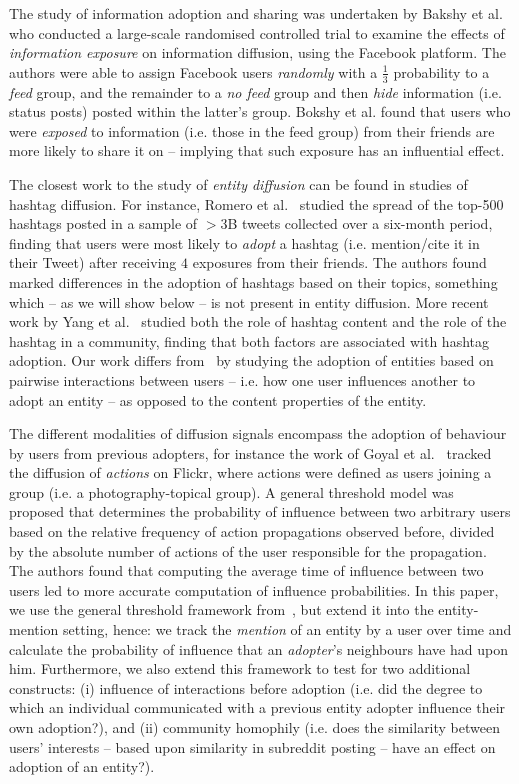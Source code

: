 \documentclass[acmsmall]{acmart}
\begin{document}
The study of information adoption and sharing was undertaken by Bakshy et al.~\cite{bakshy2012role} who conducted a large-scale randomised controlled trial to examine the effects of \emph{information exposure} on information diffusion, using the Facebook platform.
The authors were able to assign Facebook users \emph{randomly} with a $\frac{1}{3}$ probability to a \emph{feed} group, and the remainder to a \emph{no feed} group and then \emph{hide} information (i.e. status posts) posted within the latter's group.
Bokshy et al. found that users who were \emph{exposed} to information (i.e. those in the feed group) from their friends are more likely to share it on -- implying that such exposure has an influential effect.

The closest work to the study of \emph{entity diffusion} can be found in studies of hashtag diffusion.
For instance, Romero et al.~\cite{romero2011differences} studied the spread of the top-500 hashtags posted in a sample of $>3$B tweets collected over a six-month period, finding that users were most likely to \emph{adopt} a hashtag (i.e. mention/cite it in their Tweet) after receiving $4$ exposures from their friends.
The authors found marked differences in the adoption of hashtags based on their topics, something which -- as we will show below -- is not present in entity diffusion.
More recent work by Yang et al.~\cite{yang2012we} studied both the role of hashtag content and the role of the hashtag in a community, finding that both factors are associated with hashtag adoption.
Our work differs from~\cite{yang2012we} by studying the adoption of entities based on pairwise interactions between users -- i.e. how one user influences another to adopt an entity -- as opposed to the content properties of the entity.

The different modalities of diffusion signals encompass the adoption of behaviour by users from previous adopters, for instance the work of Goyal et al.~\cite{goyal2010learning} tracked the diffusion of \emph{actions} on Flickr, where actions were defined as users joining a group (i.e. a photography-topical group).
A general threshold model was proposed that determines the probability of influence between two arbitrary users based on the relative frequency of action propagations observed before, divided by the absolute number of actions of the user responsible for the propagation.
The authors found that computing the average time of influence between two users led to more accurate computation of influence probabilities.
In this paper, we use the general threshold framework from~\cite{goyal2010learning}, but extend it into the entity-mention setting, hence: we track the \emph{mention} of an entity by a user over time and calculate the probability of influence that an \emph{adopter}'s neighbours have had upon him.
Furthermore, we also extend this framework to test for two additional constructs: (i) influence of interactions before adoption (i.e. did the degree to which an individual communicated with a previous entity adopter influence their own adoption?), and (ii) community homophily (i.e. does the similarity between users' interests -- based upon similarity in subreddit posting -- have an effect on adoption of an entity?).
\end{document}
